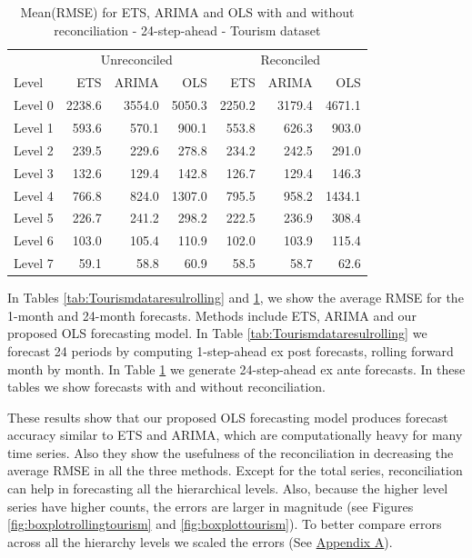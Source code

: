 \documentclass[11pt,a4paper,]{article}
\begin{document}
\begin{table}[t]

\caption{\label{tab:TourismdataresultRMSE}Mean(RMSE) for ETS, ARIMA and OLS with and without reconciliation - 24-step-ahead - Tourism dataset}
\centering
\begin{tabular}{lrrrrrr}
\toprule
\multicolumn{1}{c}{} & \multicolumn{3}{c}{Unreconciled} & \multicolumn{3}{c}{Reconciled} \\
\cmidrule(l{2pt}r{2pt}){2-4} \cmidrule(l{2pt}r{2pt}){5-7}
Level & ETS & ARIMA & OLS & ETS & ARIMA & OLS\\
\midrule
Level 0 & 2238.6 & 3554.0 & 5050.3 & 2250.2 & 3179.4 & 4671.1\\
Level 1 & 593.6 & 570.1 & 900.1 & 553.8 & 626.3 & 903.0\\
Level 2 & 239.5 & 229.6 & 278.8 & 234.2 & 242.5 & 291.0\\
Level 3 & 132.6 & 129.4 & 142.8 & 126.7 & 129.4 & 146.3\\
Level 4 & 766.8 & 824.0 & 1307.0 & 795.5 & 958.2 & 1434.1\\
Level 5 & 226.7 & 241.2 & 298.2 & 222.5 & 236.9 & 308.4\\
Level 6 & 103.0 & 105.4 & 110.9 & 102.0 & 103.9 & 115.4\\
Level 7 & 59.1 & 58.8 & 60.9 & 58.5 & 58.7 & 62.6\\
\bottomrule
\end{tabular}
\end{table}

In Tables \ref{tab:Tourismdataresulrolling} and
\ref{tab:TourismdataresultRMSE}, we show the average RMSE for the
1-month and 24-month forecasts. Methods include ETS, ARIMA and our
proposed OLS forecasting model. In Table
\ref{tab:Tourismdataresulrolling} we forecast 24 periods by computing
1-step-ahead ex post forecasts, rolling forward month by month. In Table
\ref{tab:TourismdataresultRMSE} we generate 24-step-ahead ex ante
forecasts. In these tables we show forecasts with and without
reconciliation.

These results show that our proposed OLS forecasting model produces
forecast accuracy similar to ETS and ARIMA, which are computationally
heavy for many time series. Also they show the usefulness of the
reconciliation in decreasing the average RMSE in all the three methods.
Except for the total series, reconciliation can help in forecasting all
the hierarchical levels. Also, because the higher level series have
higher counts, the errors are larger in magnitude (see Figures
\ref{fig:boxplotrollingtourism} and \ref{fig:boxplottourism}). To better
compare errors across all the hierarchy levels we scaled the errors (See
\protect\hyperlink{appendixA}{Appendix A}).
\end{document}
